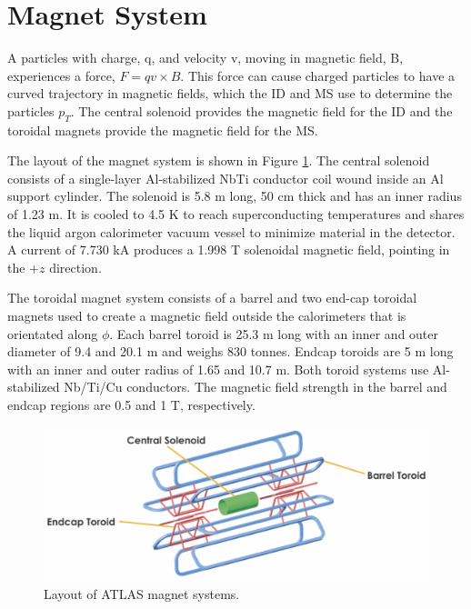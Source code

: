 \section{Magnet System}
A particles with charge, q, and velocity v, moving in magnetic field, B, experiences a force, $F= qv\times B$. This force can cause charged particles to have a curved trajectory in magnetic fields, which the ID and MS use to determine the particles $p_{T}$. The central solenoid provides the magnetic field for the ID and the toroidal magnets provide the magnetic field for the MS.

The layout of the magnet system is shown in Figure \ref{fig:atlas_magnets}. The central solenoid consists of a single-layer Al-stabilized NbTi conductor coil wound inside an Al support cylinder. The solenoid is 5.8 m long, 50 cm thick and has an inner radius of 1.23 m. It is cooled to 4.5 K to reach superconducting temperatures and shares the liquid argon calorimeter vacuum vessel to minimize material in the detector. A current of 7.730 kA produces a 1.998 T solenoidal magnetic field, pointing in the +$z$ direction. 

The toroidal magnet system consists of a barrel and two end-cap toroidal magnets used to create a magnetic field outside the calorimeters that is orientated along $\phi$. Each barrel toroid is 25.3 m long with an inner and outer diameter of 9.4 and 20.1 m and weighs 830 tonnes. Endcap toroids are 5 m long with an inner and outer radius of 1.65 and 10.7 m. Both toroid systems use Al-stabilized Nb/Ti/Cu conductors. The magnetic field strength in the barrel and endcap regions are 0.5 and 1 T, respectively.

\begin{figure}[h!]
  \centering
  \includegraphics[width=\hsize]{figures/Detector/atlas_magnets.png}
  \caption{Layout of ATLAS magnet systems.} 
  \label{fig:atlas_magnets}
\end{figure}
\FloatBarrier


